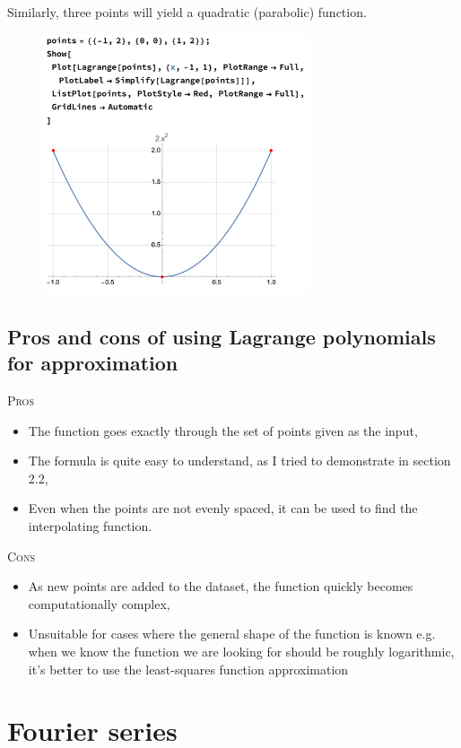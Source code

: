 \documentclass{MathematicaReport}
\begin{document}
Similarly, three points will yield a quadratic (parabolic) function.
\begin{figure}[H]
\centering
\includegraphics[width=0.7\textwidth]{images/lagrange_example4.png}
\end{figure}


\subsection{Pros and cons of using Lagrange polynomials for approximation}

\textsc{Pros}
\begin{itemize}
	\item The function goes exactly through the set of points given as the input,
	\item The formula is quite easy to understand, as I tried to demonstrate in
		section 2.2,
	\item Even when the points are not evenly spaced, it can be used to find the 
		interpolating function.
\end{itemize}

\textsc{Cons}
\begin{itemize}
	\item As new points are added to the dataset, the function quickly becomes
		computationally complex,
	\item Unsuitable for cases where the general shape of the function is known
		e.g. when we know the function we are looking for should be roughly
		logarithmic, it's better to use the least-squares function approximation
\end{itemize}

\section{Fourier series}
\end{document}
